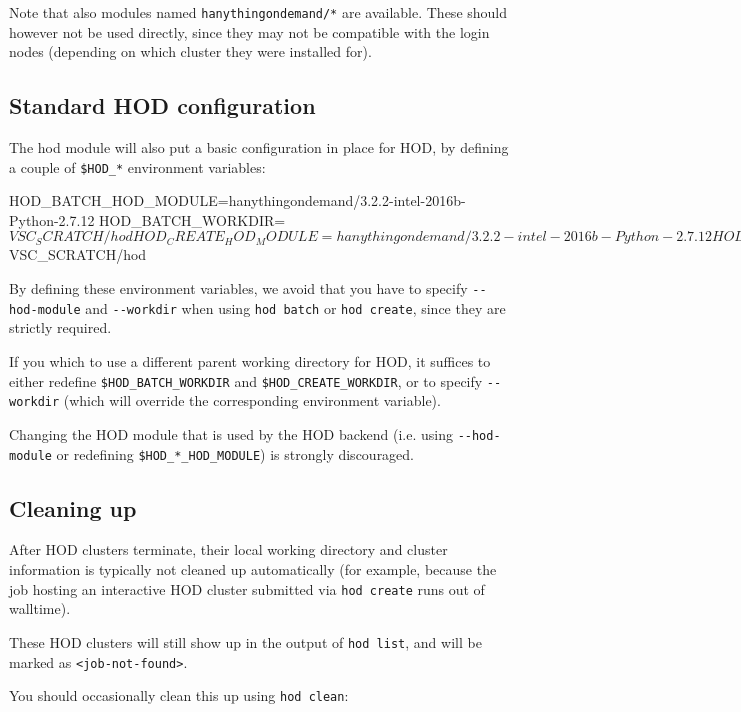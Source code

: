 Note that also modules named \lstinline|hanythingondemand/*| are available. These should
however not be used directly, since they may not be compatible with the login nodes
(depending on which cluster they were installed for).

\subsection{Standard HOD configuration}

The hod module will also put a basic configuration in place for HOD, by defining a couple of
\lstinline|$HOD_*| environment variables:

\begin{prompt}
HOD_BATCH_HOD_MODULE=hanythingondemand/3.2.2-intel-2016b-Python-2.7.12
HOD_BATCH_WORKDIR=$VSC_SCRATCH/hod
HOD_CREATE_HOD_MODULE=hanythingondemand/3.2.2-intel-2016b-Python-2.7.12
HOD_CREATE_WORKDIR=$VSC_SCRATCH/hod
\end{prompt}

By defining these environment variables, we avoid that you have to specify \lstinline|--hod-module|
and \lstinline|--workdir| when using \lstinline|hod batch| or \lstinline|hod create|, since they are strictly required.

If you which to use a different parent working directory for HOD, it suffices to
either redefine \lstinline|$HOD_BATCH_WORKDIR| and \lstinline|$HOD_CREATE_WORKDIR|,
or to specify \lstinline|--workdir| (which will override the corresponding environment variable).

Changing the HOD module that is used by the HOD backend (i.e. using \lstinline|--hod-module|
or redefining \lstinline|$HOD_*_HOD_MODULE|) is strongly discouraged.

\subsection{Cleaning up}

After HOD clusters terminate, their local working directory and cluster information
is typically not cleaned up automatically (for example, because the job hosting an
interactive HOD cluster submitted via \lstinline|hod create| runs out of walltime).

These HOD clusters will still show up in the output of \lstinline|hod list|, and will be marked as \lstinline|<job-not-found>|.

You should occasionally clean this up using \lstinline|hod clean|:

